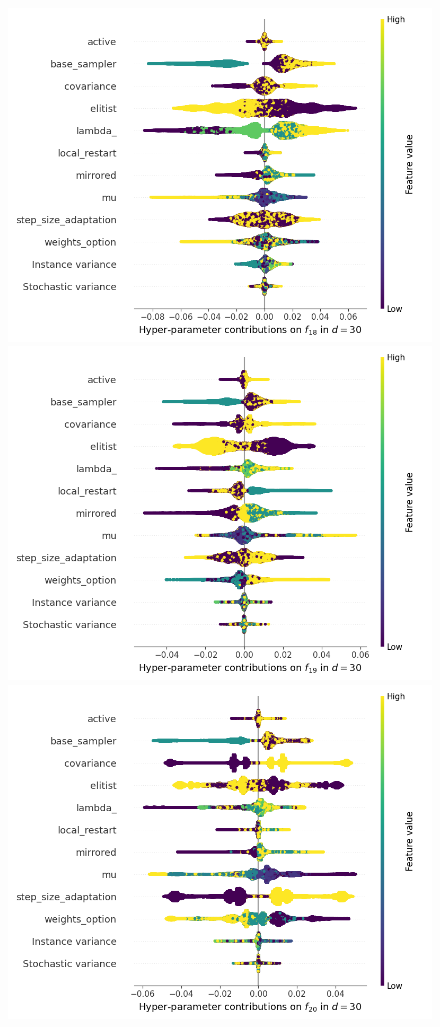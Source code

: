 \begin{figure}[t]
	\includegraphics[height=0.15\textheight,trim=60mm 0mm 30mm 0mm,clip]{cma_img_new/img_summary_f18_d30.png}
	\includegraphics[height=0.15\textheight,trim=60mm 0mm 30mm 0mm,clip]{cma_img_new/img_summary_f19_d30.png}
	\includegraphics[height=0.15\textheight,trim=60mm 0mm 0mm 0mm,clip]{cma_img_new/img_summary_f20_d30.png}

\end{figure}
